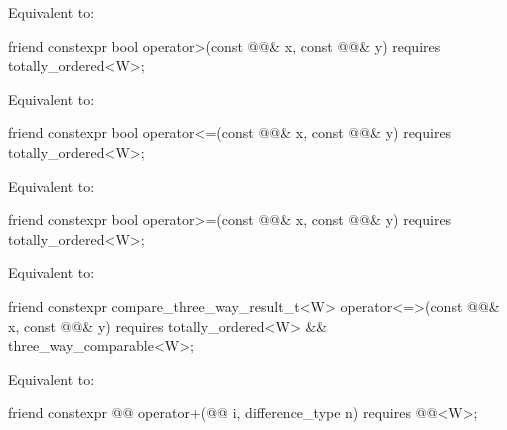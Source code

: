 \begin{itemdescr}
\pnum
\effects
Equivalent to: 
\end{itemdescr}

\begin{itemdecl}
friend constexpr bool operator>(const @@& x, const @@& y)
  requires totally_ordered<W>;
\end{itemdecl}

\begin{itemdescr}
\pnum
\effects
Equivalent to: 
\end{itemdescr}

\begin{itemdecl}
friend constexpr bool operator<=(const @@& x, const @@& y)
  requires totally_ordered<W>;
\end{itemdecl}

\begin{itemdescr}
\pnum
\effects
Equivalent to: 
\end{itemdescr}

\begin{itemdecl}
friend constexpr bool operator>=(const @@& x, const @@& y)
  requires totally_ordered<W>;
\end{itemdecl}

\begin{itemdescr}
\pnum
\effects
Equivalent to: 
\end{itemdescr}

\begin{itemdecl}
friend constexpr compare_three_way_result_t<W>
  operator<=>(const @@& x, const @@& y)
    requires totally_ordered<W> && three_way_comparable<W>;
\end{itemdecl}

\begin{itemdescr}
\pnum
\effects
Equivalent to: 
\end{itemdescr}

\begin{itemdecl}
friend constexpr @@ operator+(@@ i, difference_type n)
  requires @@<W>;
\end{itemdecl}

